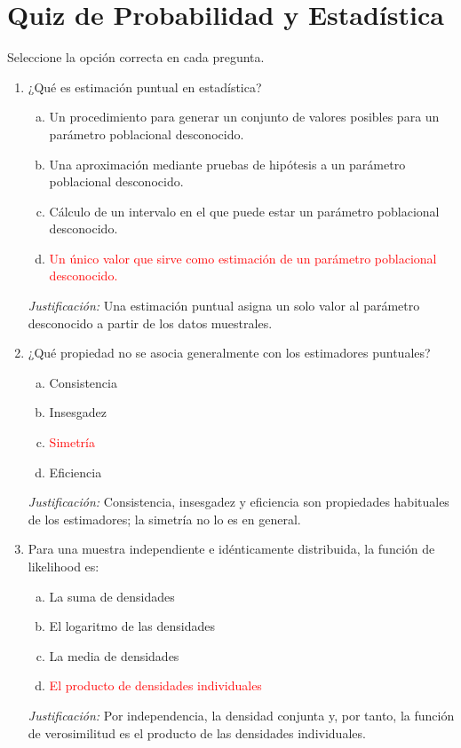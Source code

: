 \documentclass[a4paper]{article}
\begin{document}
\section{Quiz de Probabilidad y Estadística}

Seleccione la opción correcta en cada pregunta.

\begin{enumerate}

\item ¿Qué es estimación puntual en estadística?
\begin{enumerate}[a)]
    \item Un procedimiento para generar un conjunto de valores posibles para un parámetro poblacional desconocido.
    \item Una aproximación mediante pruebas de hipótesis a un parámetro poblacional desconocido.
    \item Cálculo de un intervalo en el que puede estar un parámetro poblacional desconocido.
    \item \textcolor{red}{Un único valor que sirve como estimación de un parámetro poblacional desconocido.}
\end{enumerate}
\smallskip
\textit{Justificación:} Una estimación puntual asigna un solo valor al parámetro desconocido a partir de los datos muestrales.

\item ¿Qué propiedad no se asocia generalmente con los estimadores puntuales?
\begin{enumerate}[a)]
    \item Consistencia
    \item Insesgadez
    \item \textcolor{red}{Simetría}
    \item Eficiencia
\end{enumerate}
\smallskip
\textit{Justificación:} Consistencia, insesgadez y eficiencia son propiedades habituales de los estimadores; la simetría no lo es en general.

\item Para una muestra independiente e idénticamente distribuida, la función de likelihood es:
\begin{enumerate}[a)]
    \item La suma de densidades
    \item El logaritmo de las densidades
    \item La media de densidades
    \item \textcolor{red}{El producto de densidades individuales}
\end{enumerate}
\smallskip
\textit{Justificación:} Por independencia, la densidad conjunta y, por tanto, la función de verosimilitud es el producto de las densidades individuales.


\end{enumerate}
\end{document}
